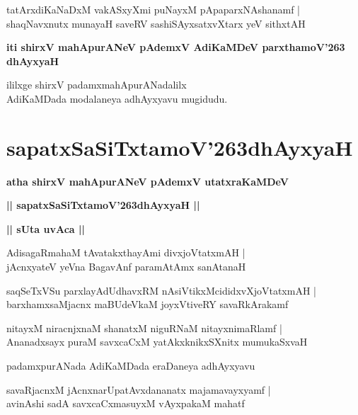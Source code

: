 \documentclass[twoside,12pt,openright]{book}
\def\S{\char'263}
\newcounter{shloka}[chapter]
\def\uvaca#1{\centerline{{\large\textbf{#1}}}}
\begin{document}
\begin{shloka}
tatArxdiKaNaDxM vakASxyXmi puNayxM pApaparxNAshanamf |\\
shaqNavxnutx munayaH saveRV sashiSAyxsatxvXtarx yeV sithxtAH
\end{shloka}

\begin{center}
{\bf{iti shirxV mahApurANeV pAdemxV AdiKaMDeV parxthamoV\char'263 dhAyxyaH}}
\end{center}

\begin{center}
ililxge shirxV padamxmahApurANadalilx \\
AdiKaMDada modalaneya adhAyxyavu mugidudu.
\end{center}

\chapter{sapatxSaSiTxtamoV\S dhAyxyaH}

\begin{center}
{\LARGE\bfseries atha shirxV mahApurANeV pAdemxV utatxraKaMDeV}
\end{center}
\begin{center}
{\LARGE\bfseries  || sapatxSaSiTxtamoV\S dhAyxyaH ||}
\end{center}

\uvaca{|| sUta uvAca ||}

\begin{shloka}
AdisagaRmahaM tAvatakxthayAmi divxjoVtatxmAH |\\
jAcnxyateV yeVna BagavAnf paramAtAmx sanAtanaH
\end{shloka}

\begin{shloka}
saqSeTxVSu parxlayAdUdhavxRM nAsiVtikxMcididxvXjoVtatxmAH |\\
barxhamxsaMjacnx maBUdeVkaM joyxVtiveRY savaRkArakamf
\end{shloka}

\begin{shloka}
nitayxM niracnjxnaM shanatxM niguRNaM nitayxnimaRlamf |\\
Ananadxsayx puraM savxcaCxM yatAkxknikxSXnitx mumukaSxvaH
\end{shloka}

\begin{center}
padamxpurANada AdiKaMDada eraDaneya adhAyxyavu
\end{center}


\begin{shloka}
savaRjacnxM jAcnxnarUpatAvxdananatx majamavayxyamf |\\
avinAshi sadA savxcaCxmasuyxM vAyxpakaM mahatf
\end{shloka}
\end{document}
